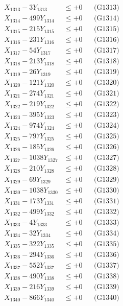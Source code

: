 \documentclass[a4paper,10pt]{article}
\begin{document}
{\begin{align}
X_{1313} - 3Y_{1313} &\leq +0 && \text{(G1313)} \\
X_{1314} - 499Y_{1314} &\leq +0 && \text{(G1314)} \\
X_{1315} - 215Y_{1315} &\leq +0 && \text{(G1315)} \\
X_{1316} - 231Y_{1316} &\leq +0 && \text{(G1316)} \\
X_{1317} - 54Y_{1317} &\leq +0 && \text{(G1317)} \\
X_{1318} - 213Y_{1318} &\leq +0 && \text{(G1318)} \\
X_{1319} - 26Y_{1319} &\leq +0 && \text{(G1319)} \\
X_{1320} - 121Y_{1320} &\leq +0 && \text{(G1320)} \\
\allowbreak
X_{1321} - 274Y_{1321} &\leq +0 && \text{(G1321)} \\
X_{1322} - 219Y_{1322} &\leq +0 && \text{(G1322)} \\
X_{1323} - 395Y_{1323} &\leq +0 && \text{(G1323)} \\
X_{1324} - 974Y_{1324} &\leq +0 && \text{(G1324)} \\
X_{1325} - 797Y_{1325} &\leq +0 && \text{(G1325)} \\
X_{1326} - 185Y_{1326} &\leq +0 && \text{(G1326)} \\
X_{1327} - 1038Y_{1327} &\leq +0 && \text{(G1327)} \\
X_{1328} - 210Y_{1328} &\leq +0 && \text{(G1328)} \\
X_{1329} - 69Y_{1329} &\leq +0 && \text{(G1329)} \\
X_{1330} - 1038Y_{1330} &\leq +0 && \text{(G1330)} \\
\allowbreak
X_{1331} - 173Y_{1331} &\leq +0 && \text{(G1331)} \\
X_{1332} - 499Y_{1332} &\leq +0 && \text{(G1332)} \\
X_{1333} - 4Y_{1333} &\leq +0 && \text{(G1333)} \\
X_{1334} - 32Y_{1334} &\leq +0 && \text{(G1334)} \\
X_{1335} - 322Y_{1335} &\leq +0 && \text{(G1335)} \\
X_{1336} - 294Y_{1336} &\leq +0 && \text{(G1336)} \\
X_{1337} - 552Y_{1337} &\leq +0 && \text{(G1337)} \\
X_{1338} - 490Y_{1338} &\leq +0 && \text{(G1338)} \\
X_{1339} - 216Y_{1339} &\leq +0 && \text{(G1339)} \\
X_{1340} - 866Y_{1340} &\leq +0 && \text{(G1340)} \\

\end{align}}
\end{document}

